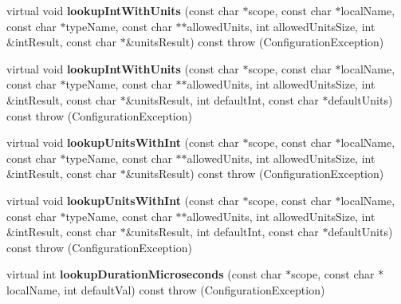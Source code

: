 \begin{DoxyCompactItemize}
\item 
\hypertarget{classCONFIG4CPP__NAMESPACE_1_1ConfigurationImpl_a865e8253377ed795485b97e9f162c52d}{virtual void {\bfseries lookup\-Int\-With\-Units} (const char $\ast$scope, const char $\ast$local\-Name, const char $\ast$type\-Name, const char $\ast$$\ast$allowed\-Units, int allowed\-Units\-Size, int \&int\-Result, const char $\ast$\&units\-Result) const   throw (\-Configuration\-Exception)}\label{classCONFIG4CPP__NAMESPACE_1_1ConfigurationImpl_a865e8253377ed795485b97e9f162c52d}

\item 
\hypertarget{classCONFIG4CPP__NAMESPACE_1_1ConfigurationImpl_aa5ade05def032359aac6ac6fdf2f5c0b}{virtual void {\bfseries lookup\-Int\-With\-Units} (const char $\ast$scope, const char $\ast$local\-Name, const char $\ast$type\-Name, const char $\ast$$\ast$allowed\-Units, int allowed\-Units\-Size, int \&int\-Result, const char $\ast$\&units\-Result, int default\-Int, const char $\ast$default\-Units) const   throw (\-Configuration\-Exception)}\label{classCONFIG4CPP__NAMESPACE_1_1ConfigurationImpl_aa5ade05def032359aac6ac6fdf2f5c0b}

\item 
\hypertarget{classCONFIG4CPP__NAMESPACE_1_1ConfigurationImpl_a965c16b66fe6728f4594b78c6201811a}{virtual void {\bfseries lookup\-Units\-With\-Int} (const char $\ast$scope, const char $\ast$local\-Name, const char $\ast$type\-Name, const char $\ast$$\ast$allowed\-Units, int allowed\-Units\-Size, int \&int\-Result, const char $\ast$\&units\-Result) const   throw (\-Configuration\-Exception)}\label{classCONFIG4CPP__NAMESPACE_1_1ConfigurationImpl_a965c16b66fe6728f4594b78c6201811a}

\item 
\hypertarget{classCONFIG4CPP__NAMESPACE_1_1ConfigurationImpl_a6db9d2f8418a03f31ef76e4a7ff06d90}{virtual void {\bfseries lookup\-Units\-With\-Int} (const char $\ast$scope, const char $\ast$local\-Name, const char $\ast$type\-Name, const char $\ast$$\ast$allowed\-Units, int allowed\-Units\-Size, int \&int\-Result, const char $\ast$\&units\-Result, int default\-Int, const char $\ast$default\-Units) const   throw (\-Configuration\-Exception)}\label{classCONFIG4CPP__NAMESPACE_1_1ConfigurationImpl_a6db9d2f8418a03f31ef76e4a7ff06d90}

\item 
\hypertarget{classCONFIG4CPP__NAMESPACE_1_1ConfigurationImpl_a5bfb0ccb8712910a3d7398a576c9b2ad}{virtual int {\bfseries lookup\-Duration\-Microseconds} (const char $\ast$scope, const char $\ast$local\-Name, int default\-Val) const   throw (\-Configuration\-Exception)}\label{classCONFIG4CPP__NAMESPACE_1_1ConfigurationImpl_a5bfb0ccb8712910a3d7398a576c9b2ad}


\end{DoxyCompactItemize}
